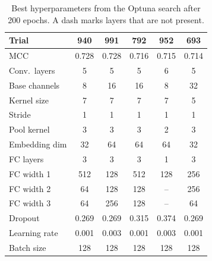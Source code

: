 \begin{table}[htbp]
\centering
\caption{Best hyperparameters from the Optuna search after 200 epochs. A dash marks layers that are not present.}
\label{tab:optuna_hparams}
\small
\setlength{\tabcolsep}{5pt}
\begin{tabular}{lccccc}
\toprule
Trial & 940 & 991 & 792 & 952 & 693 \\
\midrule
MCC            & 0.728 & 0.728 & 0.716 & 0.715 & 0.714 \\
\addlinespace
Conv.\ layers  & 5 & 5 & 5 & 6 & 5 \\
Base channels  & 8 & 16 & 16 & 8 & 32 \\
Kernel size    & 7 & 7 & 7 & 7 & 5 \\
Stride         & 1 & 1 & 1 & 1 & 1 \\
Pool kernel    & 3 & 3 & 3 & 2 & 3 \\
Embedding dim  & 32 & 64 & 64 & 64 & 32 \\
\addlinespace
FC layers      & 3 & 3 & 3 & 1 & 3 \\
FC width 1     & 512 & 128 & 512 & 128 & 256 \\
FC width 2     & 64  & 128 & 128 & --  & 256 \\
FC width 3     & 64  & 256 & 128 & --  & 64  \\
\addlinespace
Dropout        & 0.269 & 0.269 & 0.315 & 0.374 & 0.269 \\
Learning rate  & 0.001 & 0.003 & 0.001 & 0.003 & 0.001 \\
Batch size     & 128 & 128 & 128 & 128 & 128 \\
\bottomrule
\end{tabular}
\end{table}
